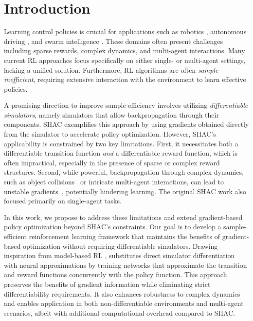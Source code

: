 
\section{Introduction}\label{sect:introduction}
Learning control policies is crucial for applications such as robotics \cite{Singh22}, autonomous driving \cite{Elallid22}, and swarm intelligence \cite{Tang21}. These domains often present challenges including sparse rewards, complex dynamics, and multi-agent interactions. Many current RL approaches focus specifically on either single- or multi-agent settings, lacking a unified solution. Furthermore, RL algorithms are often \emph{sample inefficient}, requiring extensive interaction with the environment to learn effective policies.

A promising direction to improve sample efficiency involves utilizing \emph{differentiable simulators}, namely simulators that allow backpropagation through their components. SHAC \cite{Xu22} exemplifies this approach by using gradients obtained directly from the simulator to accelerate policy optimization. However, SHAC’s applicability is constrained by two key limitations. First, it necessitates both a differentiable transition function \emph{and} a differentiable reward function, which is often impractical, especially in the presence of sparse or complex reward structures. Second, while powerful, backpropagation through complex dynamics, such as object collisions~\cite{Georgiev24} or intricate multi-agent interactions, can lead to unstable gradients~\cite{Bengio94, Metz21}, potentially hindering learning. The original SHAC work also focused primarily on single-agent tasks.

In this work, we propose \fname{} to address these limitations and extend gradient-based policy optimization beyond SHAC's constraints. Our goal is to develop a sample-efficient reinforcement learning framework that maintains the benefits of gradient-based optimization without requiring differentiable simulators. Drawing inspiration from model-based RL \cite{DBLP:conf/icml/HafnerLFVHLD19, DBLP:conf/iclr/HafnerLB020}, \fname{} substitutes direct simulator differentiation with neural approximations by training networks that approximate the transition and reward functions concurrently with the policy function. This approach preserves the benefits of gradient information while eliminating strict differentiability requirements. It also enhances robustness to complex dynamics and enables application in both non-differentiable environments and multi-agent scenarios, albeit with additional computational overhead compared to SHAC.

